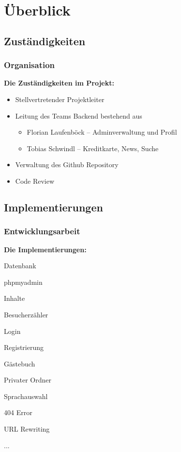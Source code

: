 \section{Überblick} %
\subsection{Zust\"andigkeiten} %

\begin{frame} %
  \frametitle{Organisation} %

\textbf{Die Zuständigkeiten im Projekt:}
\bigskip
\begin{itemize}
 \item Stellvertretender Projektleiter
 \bigskip
 \item Leitung des Teams Backend bestehend aus
 \begin{itemize}
  \item Florian Laufenböck -- Adminverwaltung und Profil
  \item Tobias Schwindl -- Kreditkarte, News, Suche
 \end{itemize}
 \bigskip
 \item Verwaltung des Github Repository
 \bigskip
 \item Code Review
\end{itemize}


\end{frame}

\subsection{Implementierungen}
\begin{frame} %
  \frametitle{Entwicklungsarbeit} %

\textbf{Die Implementierungen:}
\bigskip

  \begin{itemize}
    \begin{multicols}{2}
      \item Datenbank
      \item phpmyadmin
      \item Inhalte
      \item Besucherzähler
      \item Login
      \item Registrierung
      \item Gästebuch
      \item Privater Ordner
      \item Sprachauswahl
      \item 404 Error
      \item URL Rewriting
      \item ...
    \end{multicols}
  \end{itemize}

\end{frame}
